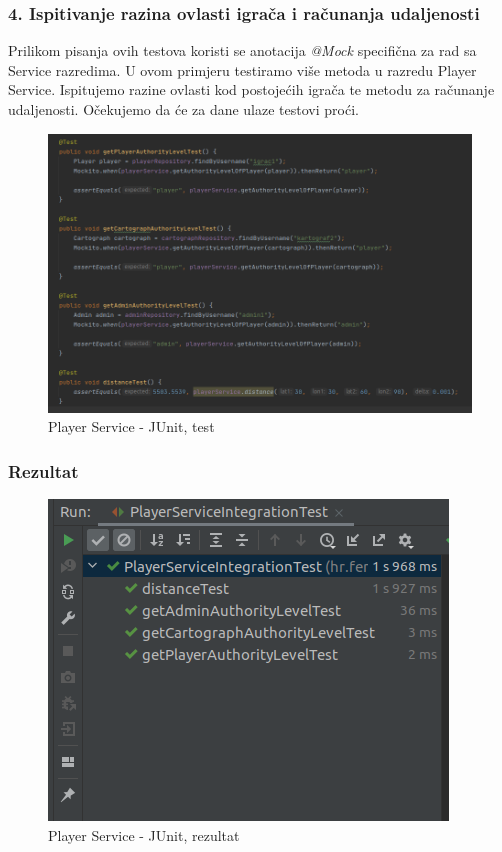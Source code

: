 			\subsubsection {4. Ispitivanje razina ovlasti igrača i računanja udaljenosti}
			
				{Prilikom pisanja ovih testova koristi se anotacija \textit{@Mock} specifična za rad sa Service razredima. U ovom primjeru testiramo više metoda u razredu Player Service. Ispitujemo razine ovlasti kod postojećih igrača te metodu za računanje udaljenosti. Očekujemo da će za dane ulaze testovi proći.}
			
					\begin{figure}[H]
						\includegraphics[width=\textwidth]{slike/playerServiceTest} 
						\centering
						\caption{Player Service - JUnit, test}
						\label{}
					\end{figure}
			
			\subsubsection{Rezultat}
			
					\begin{figure}[H]
						\includegraphics[width=\textwidth]{slike/playerServiceTest_result} 
						\centering
						\caption{Player Service - JUnit, rezultat}
						\label{}
					\end{figure}
			
